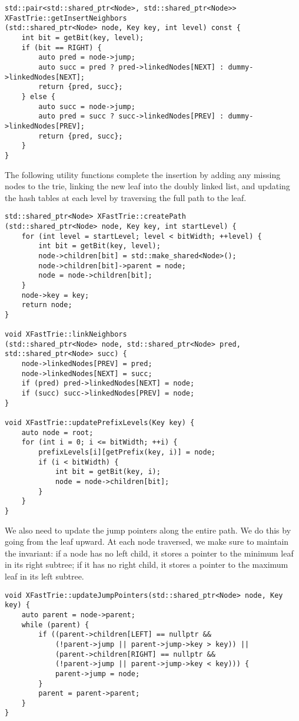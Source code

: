 \begin{verbatim}
std::pair<std::shared_ptr<Node>, std::shared_ptr<Node>> XFastTrie::getInsertNeighbors
(std::shared_ptr<Node> node, Key key, int level) const {
    int bit = getBit(key, level);
    if (bit == RIGHT) {
        auto pred = node->jump;
        auto succ = pred ? pred->linkedNodes[NEXT] : dummy->linkedNodes[NEXT];
        return {pred, succ};
    } else {
        auto succ = node->jump;
        auto pred = succ ? succ->linkedNodes[PREV] : dummy->linkedNodes[PREV];
        return {pred, succ};
    }
}
\end{verbatim}

The following utility functions complete the insertion by adding any missing nodes to the trie, linking the new leaf into the doubly linked list, and updating the hash tables at each level by traversing the full path to the leaf.

\begin{verbatim}
std::shared_ptr<Node> XFastTrie::createPath
(std::shared_ptr<Node> node, Key key, int startLevel) {
    for (int level = startLevel; level < bitWidth; ++level) {
        int bit = getBit(key, level);
        node->children[bit] = std::make_shared<Node>();
        node->children[bit]->parent = node;
        node = node->children[bit];
    }
    node->key = key;
    return node;
}

void XFastTrie::linkNeighbors
(std::shared_ptr<Node> node, std::shared_ptr<Node> pred, std::shared_ptr<Node> succ) {
    node->linkedNodes[PREV] = pred;
    node->linkedNodes[NEXT] = succ;
    if (pred) pred->linkedNodes[NEXT] = node;
    if (succ) succ->linkedNodes[PREV] = node;
}

void XFastTrie::updatePrefixLevels(Key key) {
    auto node = root;
    for (int i = 0; i <= bitWidth; ++i) {
        prefixLevels[i][getPrefix(key, i)] = node;
        if (i < bitWidth) {
            int bit = getBit(key, i);
            node = node->children[bit];
        }
    }
}
\end{verbatim}

We also need to update the jump pointers along the entire path. We do this by going from the leaf upward. At each node traversed, we make sure to maintain the invariant: if a node has no left child, it stores a pointer to the minimum leaf in its right subtree; if it has no right child, it stores a pointer to the maximum leaf in its left subtree.

\begin{verbatim}
void XFastTrie::updateJumpPointers(std::shared_ptr<Node> node, Key key) {
    auto parent = node->parent;
    while (parent) {
        if ((parent->children[LEFT] == nullptr && 
            (!parent->jump || parent->jump->key > key)) ||
            (parent->children[RIGHT] == nullptr && 
            (!parent->jump || parent->jump->key < key))) {
            parent->jump = node;
        }
        parent = parent->parent;
    }
}
\end{verbatim}

